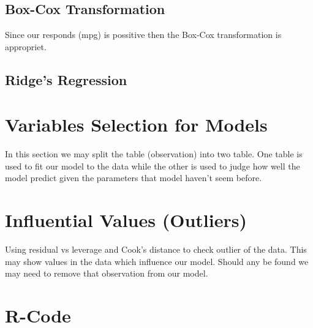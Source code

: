 \documentclass[11pt]{article} %
\begin{document}
\subsection{Box-Cox Transformation}
Since our responds (mpg) is possitive then the Box-Cox transformation is appropriet.

\subsection{Ridge's Regression}

\section{Variables Selection for Models}
In this section we may split the table (observation) into two table. One table is used to fit our model to the data while the other is used to judge how well the model predict given the parameters that model haven't seem before.


\section{Influential Values (Outliers)}
Using residual vs leverage and Cook's distance to check outlier of the data. This may show values in the data which influence our model. Should any be found we may need to remove that observation from our model. 


\newpage
\section{R-Code}
\end{document}

